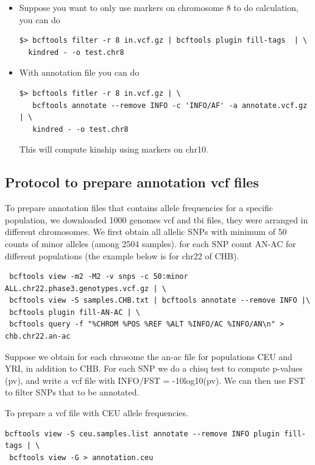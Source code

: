 \documentclass[11pt,Times]{article}
\begin{document}
\begin{itemize}
\item Suppose you want to only use markers on chromosome 8 to do calculation,  you can do 
\begin{verbatim}
$> bcftools filter -r 8 in.vcf.gz | bcftools plugin fill-tags  | \
  kindred - -o test.chr8
\end{verbatim}

\item With annotation file you can do 
\begin{verbatim}
$> bcftools fitler -r 8 in.vcf.gz | \
   bcftools annotate --remove INFO -c 'INFO/AF' -a annotate.vcf.gz  | \
   kindred - -o test.chr8
\end{verbatim}
This will compute kinship using markers on chr10. 
\end{itemize}

\subsection{Protocol to prepare annotation vcf files}
To prepare annotation files that contains allele frequencies for a specific population,  
we downloaded 1000 genomes vcf and tbi files, they were arranged in different chromosomes. 
We first obtain all allelic SNPs with minimum of 50 counts of minor alleles (among 2504 samples).  
for each SNP count AN-AC for different populations (the example below is for chr22 of CHB). 
\begin{verbatim}
 bcftools view -m2 -M2 -v snps -c 50:minor ALL.chr22.phase3.genotypes.vcf.gz | \
 bcftools view -S samples.CHB.txt | bcftools annotate --remove INFO |\
 bcftools plugin fill-AN-AC | \
 bcftools query -f "%CHROM %POS %REF %ALT %INFO/AC %INFO/AN\n" > chb.chr22.an-ac 
 \end{verbatim}
 
Suppose we obtain for each chrosome the an-ac file for populations CEU and YRI, in addition to CHB.  
For each SNP we  do a chisq test to compute p-values (pv), and write a vcf file with INFO/FST = -10log10(pv). 
We can then use FST to filter SNPs that to be annotated. 

 To prepare a vcf file with CEU allele frequencies.  
\begin{verbatim}
bcftools view -S ceu.samples.list annotate --remove INFO plugin fill-tags | \
 bcftools view -G > annotation.ceu 
\end{verbatim}
\end{document}
